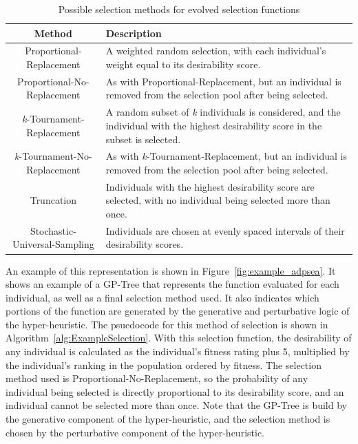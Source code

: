 \documentclass[sigconf]{acmart}
\begin{document}
\begin{table}
	\centering
	\caption{Possible selection methods for evolved selection functions}
	\label{tab:selection_methods}
	\begin{tabular}{c|p{4.5cm}}
		\hline
		Method & Description\\
		\hline
		Proportional-Replacement & A weighted random selection, with each individual's weight equal to its desirability score. \\
		\hline
		Proportional-No-Replacement & As with Proportional-Replacement, but an individual is removed from the selection pool after being selected.\\
		\hline
		\textit{k}-Tournament-Replacement& A random subset of \textit{k} individuals is considered, and the individual with the highest desirability score in the subset is selected. \\
		\hline
		\textit{k}-Tournament-No-Replacement & As with \textit{k}-Tournament-Replacement, but an individual is removed from the selection pool after being selected.\\
		\hline
		Truncation & Individuals with the highest desirability score are selected, with no individual being selected more than once. \\
		\hline
		Stochastic-Universal-Sampling & Individuals are chosen at evenly spaced intervals of their desirability scores. \\
		
		\hline
	\end{tabular}
\end{table}

An example of this representation is shown in Figure~\ref{fig:example_adpsea}. It shows an example of a GP-Tree that represents the function evaluated for each individual, as well as a final selection method used. It also indicates which portions of the function are generated by the generative and perturbative logic of the hyper-heuristic. The psuedocode for this method of selection is shown in Algorithm~\ref{alg:ExampleSelection}. With this selection function, the desirability of any individual is calculated as the individual's fitness rating plus 5, multiplied by the individual's ranking in the population ordered by fitness. The selection method used is Proportional-No-Replacement, so the probability of any individual being selected is directly proportional to its desirability score, and an individual cannot be selected more than once. Note that the GP-Tree is build by the generative component of the hyper-heuristic, and the selection method is chosen by the perturbative component of the hyper-heuristic.
\end{document}
